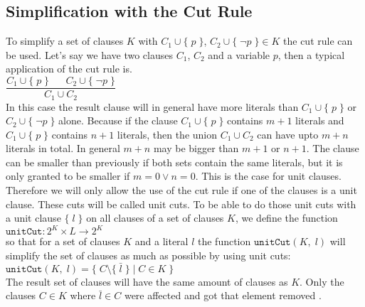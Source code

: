 \subsection{Simplification with the Cut Rule}
\label{sub:sciDavisPutnamCutRule}
To simplify a set of clauses $K$ with $C_1 \cup \{\; p\; \}$, $C_2 \cup \{\; \neg p\; \} \in K$ the cut rule can be used. Let's say we have two clauses $C_1$, $C_2$ and a variable $p$, then a typical application of the cut rule is.
\\[0.2cm]
\hspace*{1.3cm} $\dfrac{C_1 \cup \{\; p\; \} \;\;\;\;\;\; C_2 \cup \{\; \neg p\; \}}{C_1 \cup C_2}$
\\[0.2cm]
In this case the result clause will in general have more literals than $C_1 \cup \{\; p\; \}$ or $C_2 \cup \{\; \neg p\; \}$ alone. Because if the clause $C_1 \cup \{\; p\; \}$ contains $m + 1$ literals and $C_1 \cup \{\; p\; \}$ contains $n + 1$ literals, then the union $C_1 \cup C_2$ can have upto $m + n$ literals in total. In general $m + n$ may be bigger than $m + 1$ or $n + 1$. The clause can be smaller than previously if both sets contain the same literals, but it is only granted to be smaller if $m = 0 \lor n = 0$. This is the case for unit clauses. Therefore we will only allow the use of the cut rule if one of the clauses is a unit clause. These cuts will be called unit cuts. To be able to do those unit cuts with a unit clause $\{\; l\; \}$ on all clauses of a set of clauses $K$, we define the function
\\[0.2cm]
\hspace*{1.3cm} $\texttt{unitCut}: 2^{K} \times L \to 2^{K}$
\\[0.2cm]
so that for a set of clauses $K$ and a literal $l$ the function $\texttt{unitCut}(K,\; l)$ will simplify the set of clauses as much as possible by using unit cuts:
\\[0.2cm]
\hspace*{1.3cm} $\texttt{unitCut}(K,\; l) = \{\; C \setminus \{\; \bar{l}\; \}\; |\; C \in K\; \}$
\\[0.2cm]
The result set of clauses will have the same amount of clauses as $K$. Only the clauses $C \in K$ where $\bar{l} \in C$ were affected and got that element removed \cite{Stroetman2019}. 

